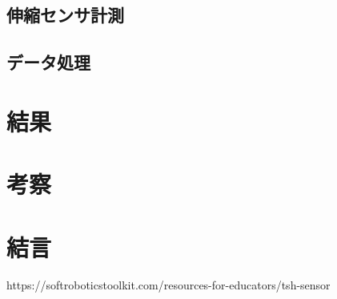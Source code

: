 \subsection{伸縮センサ計測}

\subsection{データ処理}

\section{結果}

\section{考察}

\section{結言}

\small
\begin{thebibliography}{99}
 https://softroboticstoolkit.com/resources-for-educators/tsh-sensor
\end{thebibliography}
\normalsize
